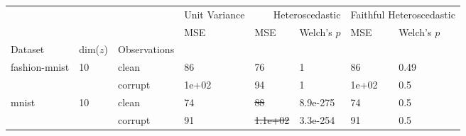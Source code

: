\begin{tabular}{lll|l|ll|ll}
\toprule
 &  &  & Unit Variance & \multicolumn{2}{r}{Heteroscedastic} & \multicolumn{2}{r}{Faithful Heteroscedastic} \\
 &  &  & MSE & MSE & Welch's $p$ & MSE & Welch's $p$ \\
Dataset & dim($z$) & Observations &  &  &  &  &  \\
\midrule
\multirow[c]{2}{*}{fashion-mnist} & \multirow[c]{2}{*}{10} & clean & 86 & 76 & 1 & 86 & 0.49 \\
 &  & corrupt & 1e+02 & 94 & 1 & 1e+02 & 0.5 \\
\multirow[c]{2}{*}{mnist} & \multirow[c]{2}{*}{10} & clean & 74 & \sout{88} & 8.9e-275 & 74 & 0.5 \\
 &  & corrupt & 91 & \sout{1.1e+02} & 3.3e-254 & 91 & 0.5 \\
\bottomrule
\end{tabular}

